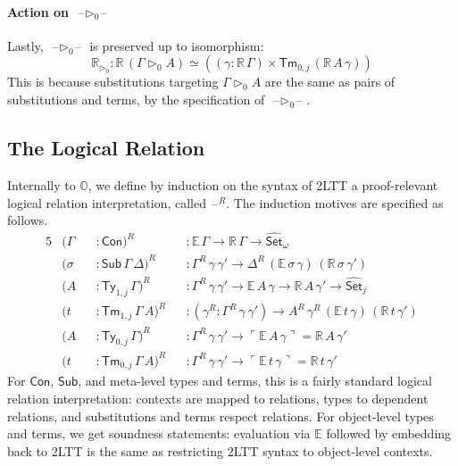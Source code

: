 \documentclass[acmsmall]{acmart}
\newcommand{\msf}[1]{\mathsf{#1}}
\newcommand{\mbb}[1]{\mathbb{#1}}
\newcommand{\wh}[1]{\widehat{#1}}
\newcommand{\ext}{\triangleright}
\newcommand{\mbbo}{\mbb{O}}
\newcommand{\Con}{\msf{Con}}
\newcommand{\Sub}{\msf{Sub}}
\newcommand{\Ty}{\msf{Ty}}
\newcommand{\Tm}{\msf{Tm}}
\newcommand{\Set}{\mathsf{Set}}
\newcommand{\blank}{{\mathord{\hspace{1pt}\text{--}\hspace{1pt}}}}
\newcommand{\emb}[1]{\ulcorner#1\urcorner}
\newcommand{\hato}{\bm\hat{\mbbo}}
\newcommand{\ev}{\mbb{E}}
\newcommand{\re}{\mbb{R}}
\theoremstyle{remark}
\newcommand{\whset}{\wh{\Set}}
\begin{document}
\paragraph{Action on $\blank\ext_0\blank$} Lastly, $\blank\ext_0\blank$ is preserved
up to isomorphism:
\[
  \re_{\ext_0} : \re\,(\Gamma \ext_0 A) \simeq ((\gamma : \re\,\Gamma)\times \Tm_{0,j}\,(\re\,A\,\gamma))
\]
This is because substitutions targeting $\Gamma \ext_0 A$ are the same as
pairs of substitutions and terms, by the specification of $\blank\ext_0\blank$.

\subsection{The Logical Relation}

Internally to $\hato$, we define by induction on the syntax of 2LTT a
proof-relevant logical relation interpretation, called $\blank^R$. The induction
motives are specified as follows.
\begin{alignat*}{5}
  &(\Gamma &&: \Con)^R && : \ev\,\Gamma \to \re\,\Gamma \to \whset_\omega\\
  &(\sigma &&: \Sub\,\Gamma\,\Delta)^R &&: \Gamma^R\,\gamma\,\gamma' \to \Delta^R\,(\ev\,\sigma\,\gamma)\,(\re\,\sigma\,\gamma')\\
  &(A      &&: \Ty_{1,j}\,\Gamma)^R &&: \Gamma^R\,\gamma\,\gamma' \to \ev\,A\,\gamma \to \re\,A\,\gamma' \to \whset_j\\
  &(t      &&: \Tm_{1,j}\,\Gamma\,A)^R &&: (\gamma^R : \Gamma^R\,\gamma\,\gamma') \to A^R\,\gamma^R\,(\ev\,t\,\gamma)\,(\re\,t\,\gamma')\\
  &(A      &&: \Ty_{0,j}\,\Gamma)^R &&: \Gamma^R\,\gamma\,\gamma' \to \emb{\ev\,A\,\gamma} = \re\,A\,\gamma' \\
  &(t      &&: \Tm_{0,j}\,\Gamma\,A)^R &&: \Gamma^R\,\gamma\,\gamma' \to \emb{\ev\,t\,\gamma} = \re\,t\,\gamma'
\end{alignat*}
For $\Con$, $\Sub$, and meta-level types and terms, this is a fairly standard
logical relation interpretation: contexts are mapped to relations, types to
dependent relations, and substitutions and terms respect relations. For
object-level types and terms, we get soundness statements: evaluation via $\ev$
followed by embedding back to 2LTT is the same as restricting 2LTT syntax to
object-level contexts.



\end{document}
